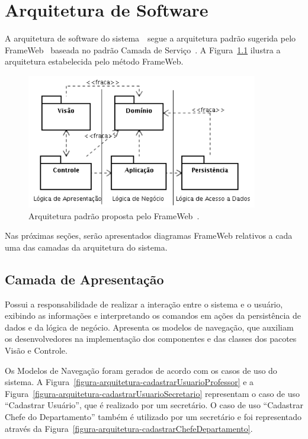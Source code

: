 
\chapter{Arquitetura de Software}
\label{sec-arquitetura}

A arquitetura de software do sistema~\imprimirtitulo\ segue a arquitetura padrão sugerida pelo FrameWeb~\cite{souza:masterthesis07,souza-et-al:iism09} baseada no padrão Camada de Serviço~\cite{fowler:book02}. A Figura~\ref{figura-arquitetura-padrao} ilustra a arquitetura estabelecida pelo método FrameWeb.

\begin{figure}[h]
	\centering
	\includegraphics[width=0.9\textwidth]{figuras/figura-arquitetura-padrao.png}
	\caption{Arquitetura padrão proposta pelo FrameWeb~\cite{souza:masterthesis07}.}
	\label{figura-arquitetura-padrao}
\end{figure}

Nas próximas seções, serão apresentados diagramas FrameWeb relativos a cada uma das camadas da arquitetura do sistema.


\section{Camada de Apresentação}
\label{sec-arquitetura-apresentacao}


Possui a responsabilidade de realizar a interação entre o sistema e o usuário, exibindo as informações e interpretando os comandos em ações da persistência de dados e da lógica de negócio. Apresenta os modelos de navegação, que auxiliam os desenvolvedores na implementação dos componentes e das classes dos pacotes Visão e Controle.

Os Modelos de Navegação foram gerados de acordo com os casos de uso do sistema. A Figura~\ref{figura-arquitetura-cadastrarUsuarioProfessor} e a Figura~\ref{figura-arquitetura-cadastrarUsuarioSecretario} representam o caso de uso ``Cadastrar Usuário'', que é realizado por um secretário. O caso de uso ``Cadastrar Chefe do Departamento'' também é utilizado por um secretário e foi representado através da Figura~\ref{figura-arquitetura-cadastrarChefeDepartamento}.  

